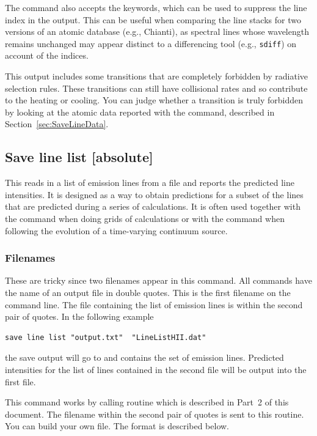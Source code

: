 The command also accepts the  keywords,
which can be used to suppress the line index in the output.
This can be useful when comparing the line stacks for two versions of an
atomic database (e.g., Chianti), as spectral lines whose wavelength remains
unchanged may appear distinct to a differencing tool (e.g., \texttt{sdiff})
on account of the indices.

This output includes some transitions that are completely forbidden by
radiative selection rules.  These transitions can still have collisional
rates and so contribute to the heating or cooling.  You can judge
whether a transition is truly forbidden by looking at the atomic data
reported with the  command, described in
Section~\ref{sec:SaveLineData}.

\subsection{Save line list [absolute]}

This reads in a list of emission lines from a file and reports the
predicted line intensities.  It is designed as a way to obtain predictions
for a subset of the lines that are predicted during a series of calculations.
It is often used together with the  command
when doing grids of calculations or with the  command
when following the evolution of a time-varying
continuum source.

\subsubsection{Filenames}  
These are tricky since two filenames appear in this command.
All  commands have the name of an output file
in double quotes.
This is the first filename on the command line.
The file containing the list
of emission lines is within the second pair of quotes.  In the following
example
\begin{verbatim}
save line list "output.txt"  "LineListHII.dat"
\end{verbatim}
the save output will go to 
and  contains the
set of emission lines.
Predicted intensities for the list of lines contained
in the second file will be output into the first file.
 
This command works by calling routine 
which is described in Part~2 of this document.
The filename within the second pair of quotes
is sent to this routine.
You can build your own file. The format is described below.

